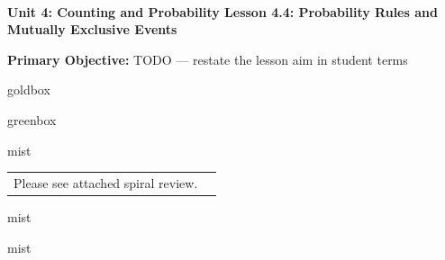 \documentclass[10pt]{article}
\newcommand{\UnitNumberName}{Unit 4: Counting and Probability \quad}
\newcommand{\LessonNumberName}{Lesson 4.4: Probability Rules and Mutually Exclusive Events}
\begin{document}
\begin{center}
    {\Large\bfseries \CourseName \\
    {\small\bfseries \UnitNumberName \LessonNumberName}}
\end{center}

\begin{tcolorbox}[colback=mist, colframe=royal, boxrule=0.9pt, arc=2mm,
    left=2mm, right=2mm, top=1.5mm, bottom=1.5mm]
    \textbf{Primary Objective:} TODO --- restate the lesson aim in student terms
\end{tcolorbox}

\renewcommand{\arraystretch}{1.6}
\begin{skillbox}{goldbox}
\end{skillbox}

\begin{skillbox}{greenbox}
\end{skillbox}

\begin{fixedskillbox}{mist}
    \begin{tabularx}{\linewidth}{@{}X c@{}}
        \begin{minipage}[t]{0.55\linewidth}\vspace{0pt}
            Please see attached spiral review.  %
        \end{minipage}
        &
        \begin{minipage}[t]{0.38\linewidth}\vspace{0pt}\centering
        \end{minipage}
    \end{tabularx}
\end{fixedskillbox}

\begin{skillbox}[Hook]{mist}
\end{skillbox}

\begin{skillbox}[Lesson]{mist}
\end{skillbox}
\end{document}
